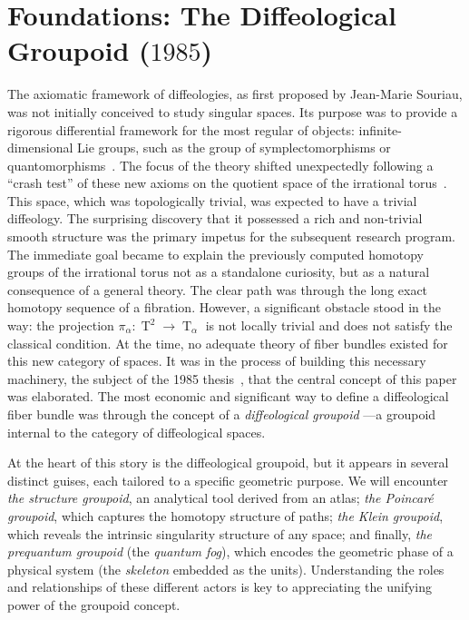 \documentclass[10pt,reqno,letterpaper,twoside]{amsart}
\theoremstyle{article}
\newcommand{\Torus}{\operatorname{T}}
\begin{document}
  \section{Foundations: The Diffeological Groupoid ($1985$)}
  
  The axiomatic framework of diffeologies,
  as first proposed by Jean-Marie Souriau,
  was not initially conceived to study singular spaces.
  Its purpose was to provide a rigorous differential framework for the most regular of objects:
  infinite-dimensional Lie groups,
  such as the group of symplectomorphisms or quantomorphisms~\cite{Sou80}.
  The focus of the theory shifted unexpectedly following a ``crash test'' of these new axioms on the quotient space of the irrational torus~\cite{DIZ83}.
  This space,
  which was topologically trivial,
  was expected to have a trivial diffeology.
  The surprising discovery that it possessed a rich and non-trivial smooth structure was the primary impetus for the subsequent research program.
  The immediate goal became to explain the previously computed homotopy groups of the irrational torus not as a standalone curiosity,
  but as a natural consequence of a general theory.
  The clear path was through the long exact homotopy sequence of a fibration.
  However,
  a significant obstacle stood in the way:
  the projection $\pi_\alpha : \Torus^2 \to \Torus_\alpha$ is not locally trivial and does not satisfy the classical condition.
  At the time,
  no adequate theory of fiber bundles existed for this new category of spaces.
  It was in the process of building this necessary machinery,
  the subject of the 1985 thesis~\cite{PIZ85},
  that the central concept of this paper was elaborated.
  The most economic and significant way to define a diffeological fiber bundle was through the concept of a \emph{diffeological groupoid}
  ---a groupoid internal to the category of diffeological spaces.
  
  At the heart of this story is the diffeological groupoid,
  but it appears in several distinct guises,
  each tailored to a specific geometric purpose.
  We will encounter \emph{the structure groupoid},
  an analytical tool derived from an atlas;
  \emph{the Poincaré groupoid},
  which captures the homotopy structure of paths;
  \emph{the Klein groupoid},
  which reveals the intrinsic singularity structure of any space;
  and finally,
  \emph{the prequantum groupoid} (the \emph{quantum fog}\/),
  which encodes the geometric phase of a physical system (the \emph{skeleton} embedded as the units).
  Understanding the roles and relationships of these different actors is key to appreciating the unifying power of the groupoid concept.  
  
\end{document}
